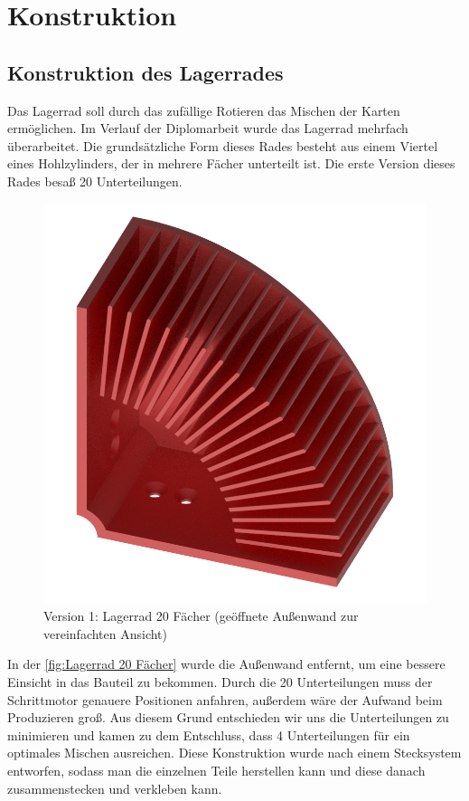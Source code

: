 \pagebreak
\section{Konstruktion}
\subsection{Konstruktion des Lagerrades}
Das Lagerrad soll durch das zufällige Rotieren das Mischen der Karten ermöglichen. Im Verlauf der Diplomarbeit wurde das Lagerrad mehrfach überarbeitet.
Die grundsätzliche Form dieses Rades besteht aus einem Viertel eines Hohlzylinders, der in mehrere Fächer unterteilt ist. Die erste Version dieses Rades besaß 20 Unterteilungen.

\begin{figure}[H]
    \centering
    \includegraphics[scale=0.5,page=1]{fig/mech/LagerRad}
    \caption{Version 1: Lagerrad 20 Fächer (geöffnete Außenwand zur vereinfachten Ansicht)}
    \label{fig:Lagerrad 20 Fächer}
\end{figure}
In der \autoref{fig:Lagerrad 20 Fächer} wurde die Außenwand entfernt, um eine bessere Einsicht in das Bauteil zu bekommen.
Durch die 20 Unterteilungen muss der Schrittmotor genauere Positionen anfahren, außerdem wäre der Aufwand beim Produzieren groß. Aus diesem Grund
entschieden wir uns die Unterteilungen zu minimieren und kamen zu dem Entschluss, dass 4 Unterteilungen für ein optimales Mischen ausreichen. Diese Konstruktion
wurde nach einem Stecksystem entworfen, sodass man die einzelnen Teile herstellen kann und diese danach zusammenstecken und verkleben kann.

